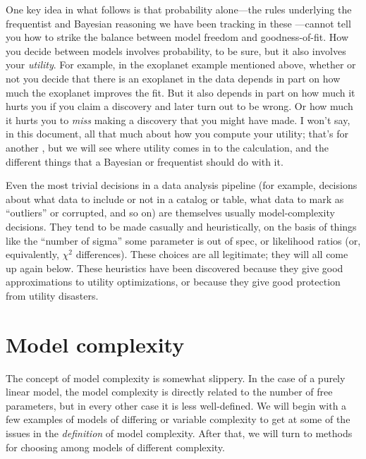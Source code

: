 \documentclass[12pt,twoside]{article}
\begin{document}
One key idea in what follows is that probability alone---the rules
underlying the frequentist and Bayesian reasoning we have been
tracking in these \documentnames ---cannot tell you how to strike the
balance between model freedom and goodness-of-fit.  How you decide
between models involves probability, to be sure, but it also involves
your \emph{utility}.  For example, in the exoplanet example mentioned
above, whether or not you decide that there is an exoplanet in the
data depends in part on how much the exoplanet improves the fit.  But
it also depends in part on how much it hurts you if you claim a
discovery and later turn out to be wrong.  Or how much it hurts you to
\emph{miss} making a discovery that you might have made.  I won't say,
in this document, all that much about how you compute your utility;
that's for another \documentname{},
but we will see where utility comes in to the calculation, and the
different things that a Bayesian or frequentist should do with it.

Even the most trivial decisions in a data analysis pipeline (for
example, decisions about what data to include or not in a catalog or
table, what data to mark as ``outliers'' or corrupted, and so on) are
themselves usually model-complexity decisions.  They tend to be made
casually and heuristically, on the basis of things like the ``number
of sigma'' some parameter is out of spec, or likelihood ratios (or,
equivalently, $\chi^2$ differences).  These choices are all
legitimate; they will all come up again below.  These heuristics have
been discovered because they give good approximations to utility
optimizations, or because they give good protection from utility
disasters.

\section{Model complexity}

The concept of model complexity is somewhat slippery.  In the case of
a purely linear model, the model complexity is directly related to the
number of free parameters, but in every other case it is less
well-defined.  We will begin with a few examples of models of
differing or variable complexity to get at some of the issues in the
\emph{definition} of model complexity.  After that, we will turn to
methods for choosing among models of different complexity.
\end{document}
